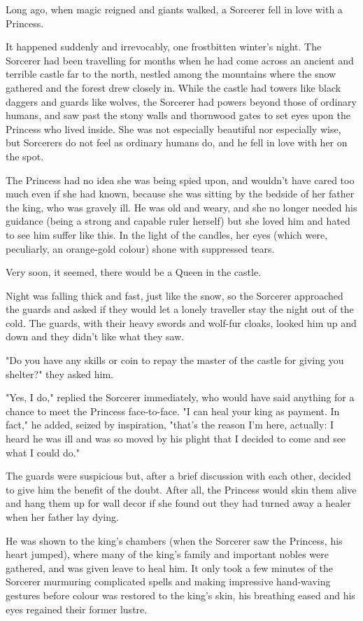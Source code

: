 Long ago, when magic reigned and giants walked, a Sorcerer fell in love with a Princess. 

It happened suddenly and irrevocably, one frostbitten winter’s night. The Sorcerer had been travelling for months when he had come across an ancient and terrible castle far to the north, nestled among the mountains where the snow gathered and the forest drew closely in. While the castle had towers like black daggers and guards like wolves, the Sorcerer had powers beyond those of ordinary humans, and saw past the stony walls and thornwood gates to set eyes upon the Princess who lived inside. She was not especially beautiful nor especially wise, but Sorcerers do not feel as ordinary humans do, and he fell in love with her on the spot.  

The Princess had no idea she was being spied upon, and wouldn’t have cared too much even if she had known, because she was sitting by the bedside of her father the king, who was gravely ill. He was old and weary, and she no longer needed his guidance (being a strong and capable ruler herself) but she loved him and hated to see him suffer like this. In the light of the candles, her eyes (which were, peculiarly, an orange-gold colour) shone with suppressed tears. 

Very soon, it seemed, there would be a Queen in the castle. 

Night was falling thick and fast, just like the snow, so the Sorcerer approached the guards and asked if they would let a lonely traveller stay the night out of the cold. The guards, with their heavy swords and wolf-fur cloaks, looked him up and down and they didn't like what they saw.

"Do you have any skills or coin to repay the master of the castle for giving you shelter?" they asked him.

"Yes, I do," replied the Sorcerer immediately, who would have said anything for a chance to meet the Princess face-to-face. "I can heal your king as payment. In fact," he added, seized by inspiration, "that's the reason I'm here, actually: I heard he was ill and was so moved by his plight that I decided to come and see what I could do." 

The guards were suspicious but, after a brief discussion with each other, decided to give him the benefit of the doubt. After all, the Princess would skin them alive and hang them up for wall decor if she found out they had turned away a healer when her father lay dying. 

He was shown to the king’s chambers (when the Sorcerer saw the Princess, his heart jumped), where many of the king’s family and important nobles were gathered, and was given leave to heal him. It only took a few minutes of the Sorcerer murmuring complicated spells and making impressive hand-waving gestures before colour was restored to the king’s skin, his breathing eased and his eyes regained their former lustre.

